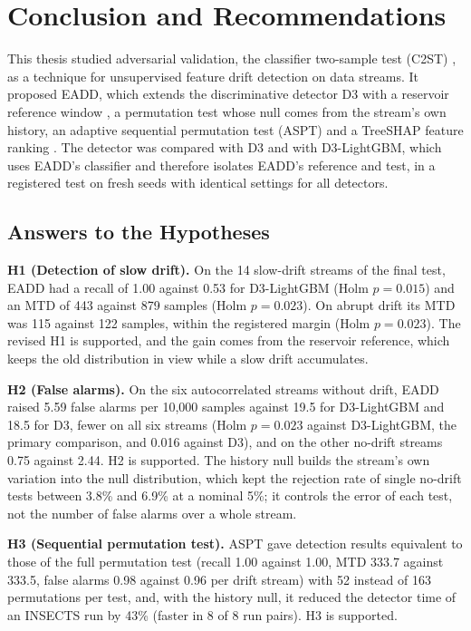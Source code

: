 \chapter{Conclusion and Recommendations} \label{chap:conclusion}

This thesis studied adversarial validation, the classifier two-sample test (C2ST) \citep{LopezPazOquab2017}, as a technique for unsupervised feature drift detection on data streams. It proposed EADD, which extends the discriminative detector D3 \citep{Gozuacik2019} with a reservoir reference window \citep{Vitter1985}, a permutation test whose null comes from the stream's own history, an adaptive sequential permutation test (ASPT) and a TreeSHAP feature ranking \citep{LundbergInteraction2020}. The detector was compared with D3 and with D3-LightGBM, which uses EADD's classifier and therefore isolates EADD's reference and test, in a registered test on fresh seeds with identical settings for all detectors.

\section{Answers to the Hypotheses}

\textbf{H1 (Detection of slow drift).} \textit{\hypHone} On the 14 slow-drift streams of the final test, EADD had a recall of 1.00 against 0.53 for D3-LightGBM (Holm $p = 0.015$) and an MTD of 443 against 879 samples (Holm $p = 0.023$). On abrupt drift its MTD was 115 against 122 samples, within the registered margin (Holm $p = 0.023$). The revised H1 is supported, and the gain comes from the reservoir reference, which keeps the old distribution in view while a slow drift accumulates.

\textbf{H2 (False alarms).} \textit{\hypHtwo} On the six autocorrelated streams without drift, EADD raised 5.59 false alarms per 10,000 samples against 19.5 for D3-LightGBM and 18.5 for D3, fewer on all six streams (Holm $p = 0.023$ against D3-LightGBM, the primary comparison, and 0.016 against D3), and on the other no-drift streams 0.75 against 2.44. H2 is supported. The history null builds the stream's own variation into the null distribution, which kept the rejection rate of single no-drift tests between 3.8\% and 6.9\% at a nominal 5\%; it controls the error of each test, not the number of false alarms over a whole stream.

\textbf{H3 (Sequential permutation test).} \textit{\hypHthree} ASPT gave detection results equivalent to those of the full permutation test (recall 1.00 against 1.00, MTD 333.7 against 333.5, false alarms 0.98 against 0.96 per drift stream) with 52 instead of 163 permutations per test, and, with the history null, it reduced the detector time of an INSECTS run by 43\% (faster in 8 of 8 run pairs). H3 is supported.

